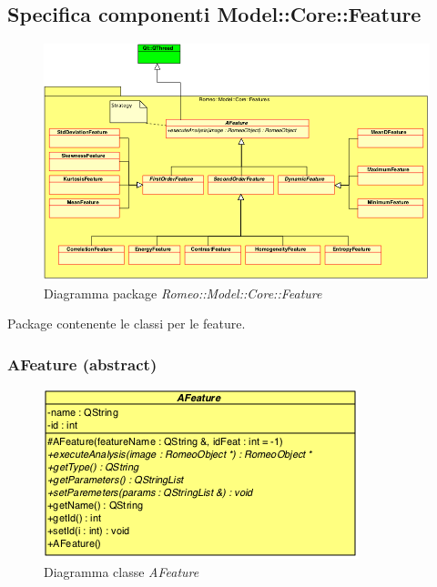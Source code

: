 \color{black}
\subsection{Specifica componenti Model::Core::Feature}
\label{specificaModelCoreAlgorithm}

\begin{figure}[!h]
\centering
			\includegraphics[scale=0.6]{../Specifica_Tecnica/Content/Immagini/Romeo__Model__Core__Adapters__Features.png}
			\caption{Diagramma package \textsl{Romeo::Model::Core::Feature}}
			\label{romeo_model_core}
\end{figure}

Package\g{} contenente le classi per le feature\g{}.

\subsubsection{AFeature (abstract)}
\label{afeature}
\begin{figure}[!h]
\centering
			\includegraphics[scale=1]{./Content/Immagini/modelCore/AFeature.png}
			\caption{Diagramma classe \textsl{AFeature}}
			\label{feature_img}
\end{figure}

